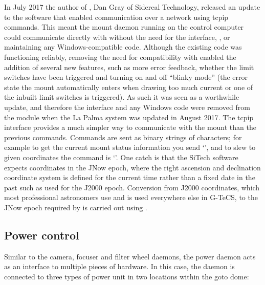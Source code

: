 \begin{colsection}
\begin{colsection}
In July 2017 the author of , Dan Gray of Sidereal Technology, released an update to the software that enabled communication over a network using \gls{tcpip} commands. This meant the mount daemon running on the control computer could communicate directly with  without the need for the  interface, ,  or maintaining any Windows-compatible code. Although the existing code was functioning reliably, removing the need for compatibility with  enabled the addition of several new features, such as more error feedback, whether the limit switches have been triggered and turning on and off ``blinky mode'' (the error state the mount automatically enters when drawing too much current or one of the inbuilt limit switches is triggered). As such it was seen as a worthwhile update, and therefore the  interface and any Windows code were removed from the  module when the La Palma system was updated in August 2017. The \gls{tcpip} interface provides a much simpler way to communicate with the mount than the previous  commands. Commands are sent as binary strings of characters; for example to get the current mount status information you send `', and to slew to given coordinates the command is `'. One catch is that the SiTech software expects coordinates in the JNow epoch, where the right ascension and declination coordinate system is defined for the current time rather than a fixed date in the past such as used for the J2000 epoch. Conversion from J2000 coordinates, which most professional astronomers use and is used everywhere else in G-TeCS, to the JNow epoch required by  is carried out using .

\end{colsection}


\subsection{Power control}
\label{sec:power}
\begin{colsection}

Similar to the camera, focuser and filter wheel daemons, the power daemon acts as an interface to multiple pieces of hardware. In this case, the daemon is connected to three types of power unit in two locations within the \gls{goto} dome:


\end{colsection}
\end{colsection}
